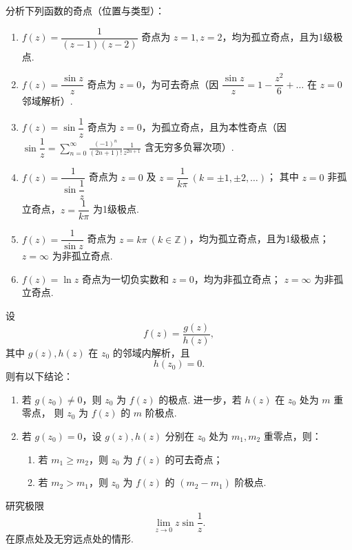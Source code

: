 \documentclass[openany,oneside]{ctexbook}
\begin{document}
\begin{example}
分析下列函数的奇点（位置与类型）：
\begin{enumerate}
    \item \( f(z)=\dfrac{1}{(z-1)(z-2)} \)
    \newline
    奇点为 \( z=1, z=2 \)，均为孤立奇点，且为1级极点.

    \item \( f(z)=\dfrac{\sin z}{z} \)
    \newline
    奇点为 \( z=0 \)，为可去奇点（因 \( \dfrac{\sin z}{z}=1-\dfrac{z^2}{6}+\dots \) 在 \( z=0 \) 邻域解析）.

    \item \( f(z)=\sin\dfrac{1}{z} \)
    \newline
    奇点为 \( z=0 \)，为孤立奇点，且为本性奇点（因 \( \sin\dfrac{1}{z}=\displaystyle\sum_{n=0}^{\infty}\frac{(-1)^n}{(2n+1)!}\frac{1}{z^{2n+1}} \) 含无穷多负幂次项）.

    \item \( f(z)=\dfrac{1}{\sin\dfrac{1}{z}} \)
    \newline
    奇点为 \( z=0 \) 及 \( z=\dfrac{1}{k\pi} \ (k=\pm1,\pm2,\dots) \)；
    其中 \( z=0 \) 非孤立奇点，\( z=\dfrac{1}{k\pi} \) 为1级极点.

    \item \( f(z)=\dfrac{1}{\sin z} \)
    \newline
    奇点为 \( z=k\pi \ (k\in\mathbb{Z}) \)，均为孤立奇点，且为1级极点；
    \( z=\infty \) 为非孤立奇点.

    \item \( f(z)=\ln z \)
    \newline
    奇点为一切负实数和 \( z=0 \)，均为非孤立奇点；
    \( z=\infty \) 为非孤立奇点.
\end{enumerate}
\end{example}
\begin{theorem}
设
\[
f(z)=\frac{g(z)}{h(z)},
\]
其中 $g(z),h(z)$ 在 $z_0$ 的邻域内解析，且
\[
h(z_0)=0.
\]
则有以下结论：
\begin{enumerate}
  \item 若 $g(z_0)\neq 0$，则 $z_0$ 为 $f(z)$ 的极点.
  进一步，若 $h(z)$ 在 $z_0$ 处为 $m$ 重零点，
  则 $z_0$ 为 $f(z)$ 的 $m$ 阶极点.

  \item 若 $g(z_0)=0$，设 $g(z),h(z)$ 分别在 $z_0$ 处为
  $m_1,m_2$ 重零点，则：
  \begin{enumerate}
    \item 若 $m_1\ge m_2$，则 $z_0$ 为 $f(z)$ 的可去奇点；
    \item 若 $m_2>m_1$，则 $z_0$ 为 $f(z)$ 的 $(m_2-m_1)$ 阶极点.
  \end{enumerate}
\end{enumerate}
\end{theorem}
\begin{example}
研究极限
\[
\lim_{z\to 0} z\sin\frac{1}{z}.
\]
在原点处及无穷远点处的情形.
\end{example}
\end{document}

